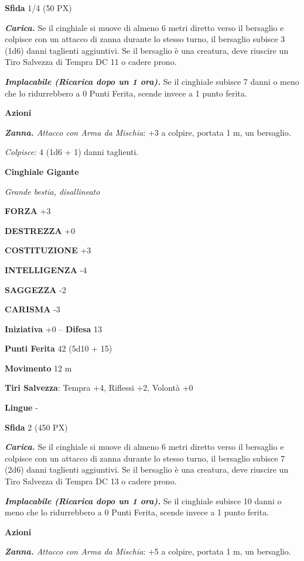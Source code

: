 \begin{multicols}{2}
\textbf{Sfida} 1/4 (50 PX)

\textit{\textbf{Carica.}} Se il cinghiale si muove di almeno 6 metri diretto verso il bersaglio e colpisce con un attacco di zanna durante lo stesso turno, il bersaglio subisce 3 (1d6) danni taglienti aggiuntivi. Se il bersaglio è una creatura, deve riuscire un Tiro Salvezza di Tempra
DC 11 o cadere prono.

\textit{\textbf{Implacabile (Ricarica dopo un 1 ora).}} Se il cinghiale subisce 7 danni o meno che lo ridurrebbero a 0 Punti Ferita, scende invece a 1 punto ferita.

\textbf{Azioni}

\textit{\textbf{Zanna.} Attacco con Arma da Mischia}: +3 a colpire, portata 1 m, un bersaglio.

\textit{Colpisce:} 4 (1d6 + 1) danni taglienti.

\medskip\textbf{Cinghiale Gigante}

\textit{Grande bestia, disallineato}

\textbf{FORZA} +3

\textbf{DESTREZZA} +0

\textbf{COSTITUZIONE} +3

\textbf{INTELLIGENZA} -4

\textbf{SAGGEZZA} -2

\textbf{CARISMA} -3

\textbf{Iniziativa} +0 -- \textbf{Difesa} 13

\textbf{Punti Ferita} 42 (5d10 + 15)

\textbf{Movimento} 12 m

\textbf{Tiri Salvezza}: Tempra +4, Riflessi +2, Volontà +0

\textbf{Lingue} -

\textbf{Sfida} 2 (450 PX)

\textit{\textbf{Carica.}} Se il cinghiale si muove di almeno 6 metri diretto verso il bersaglio e colpisce con un attacco di zanna durante lo stesso turno, il bersaglio subisce 7 (2d6) danni taglienti aggiuntivi. Se il bersaglio è una creatura, deve riuscire un Tiro Salvezza di Tempra DC 13 o cadere prono.

\textit{\textbf{Implacabile (Ricarica dopo un 1 ora).}} Se il cinghiale subisce 10 danni o meno che lo ridurrebbero a 0 Punti Ferita, scende invece a 1 punto ferita.

\textbf{Azioni}

\textit{\textbf{Zanna.} Attacco con Arma da Mischia}: +5 a colpire, portata 1 m, un bersaglio.


\end{multicols}
